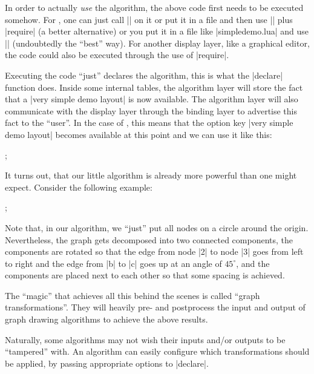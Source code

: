 In order to actually \emph{use} the algorithm, the above code first needs to be
executed somehow. For \tikzname, one can just call |\directlua| on it or put it
in a file and then use |\directlua| plus |require| (a better alternative) or
you put it in a file like |simpledemo.lua| and use ||
(undoubtedly the ``best'' way). For another display layer, like a graphical
editor, the code could also be executed through the use of |require|.

Executing the code ``just'' declares the algorithm, this is what the |declare|
function does. Inside some internal tables, the algorithm layer will store the
fact that a  |very simple demo layout| is now available. The algorithm layer
will also communicate with the display layer through the binding layer to
advertise this fact to the ``user''. In the case of \tikzname, this means that
the option key |very simple demo layout| becomes available at this point and we
can use it like this:
%
\begin{codeexample}[]
  ;
\end{codeexample}

It turns out, that our little algorithm is already more powerful than one might
expect. Consider the following example:
%
\begin{codeexample}[]
  ;
\end{codeexample}

Note that, in our algorithm, we ``just'' put all nodes on a circle around the
origin. Nevertheless, the graph gets decomposed into two connected components,
the components are rotated so that the edge from node |2| to node |3| goes from
left to right and the edge from |b| to |c| goes up at an angle of $45^\circ$,
and the components are placed next to each other so that some spacing is
achieved.

The ``magic'' that achieves all this behind the scenes is called ``graph
transformations''. They will heavily pre- and postprocess the input and output
of graph drawing algorithms to achieve the above results.

Naturally, some algorithms may not wish their inputs and/or outputs to be
``tampered'' with. An algorithm can easily configure which transformations
should be applied, by passing appropriate options to |declare|.


